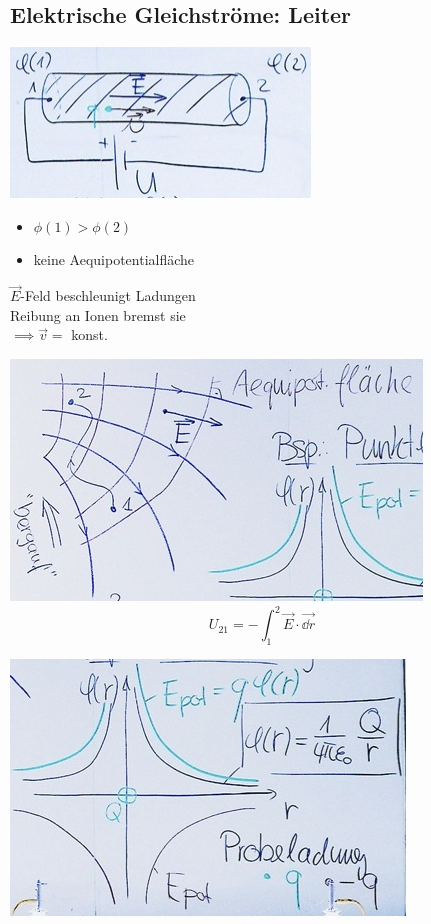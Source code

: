 \subsection{Elektrische Gleichströme: Leiter}
\includegraphics{Bild171} \\
\begin{itemize}[ label = $\implies$ ]
	\item $\phi(1) > \phi(2)$
	\item keine Aequipotentialfläche
\end{itemize}
$\vec{E}$-Feld beschleunigt Ladungen \\
Reibung an Ionen bremst sie \\
$\implies \vec{v} =$ konst.

\begin{rep*}[ note = Elekrische Spannung - elektrisches Potential ]
	\includegraphics{Bild172}
	\[ U_{21} = - \int_1^2 \vec{E} \cdot \vec{\dd r} \]
	\begin{bsp*}[ note = Punktladung ]
		\includegraphics{Bild173}
	\end{bsp*}
\end{rep*}

